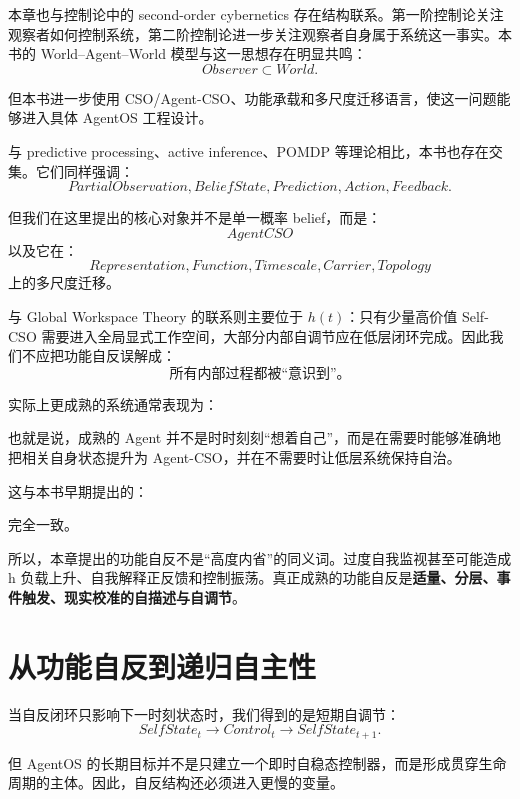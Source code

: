 本章也与控制论中的 second-order cybernetics 存在结构联系。第一阶控制论关注观察者如何控制系统，第二阶控制论进一步关注观察者自身属于系统这一事实。本书的 World--Agent--World 模型与这一思想存在明显共鸣：
\[
Observer\subset World.
\]

但本书进一步使用 CSO/Agent-CSO、功能承载和多尺度迁移语言，使这一问题能够进入具体 AgentOS 工程设计。

与 predictive processing、active inference、POMDP 等理论相比，本书也存在交集。它们同样强调：
\[
PartialObservation,
BeliefState,
Prediction,
Action,
Feedback.
\]

但我们在这里提出的核心对象并不是单一概率 belief，而是：
\[
AgentCSO
\]
以及它在：
\[
Representation,
Function,
Timescale,
Carrier,
Topology
\]
上的多尺度迁移。

与 Global Workspace Theory 的联系则主要位于 \(h(t)\)：只有少量高价值 Self-CSO 需要进入全局显式工作空间，大部分内部自调节应在低层闭环完成。因此我们不应把功能自反误解成：
\[
\text{所有内部过程都被“意识到”。}
\]

实际上更成熟的系统通常表现为：
\begin{statementbox}
\centering
{}
\end{statementbox}

也就是说，成熟的 Agent 并不是时时刻刻“想着自己”，而是在需要时能够准确地把相关自身状态提升为 Agent-CSO，并在不需要时让低层系统保持自治。

这与本书早期提出的：
\begin{statementbox}
\centering
{}
\end{statementbox}
完全一致。

所以，本章提出的功能自反不是“高度内省”的同义词。过度自我监视甚至可能造成 h 负载上升、自我解释正反馈和控制振荡。真正成熟的功能自反是\textbf{适量、分层、事件触发、现实校准的自描述与自调节}。

\section{从功能自反到递归自主性}

当自反闭环只影响下一时刻状态时，我们得到的是短期自调节：
\[
SelfState_t
\rightarrow
Control_t
\rightarrow
SelfState_{t+1}.
\]

但 AgentOS 的长期目标并不是只建立一个即时自稳态控制器，而是形成贯穿生命周期的主体。因此，自反结构还必须进入更慢的变量。

